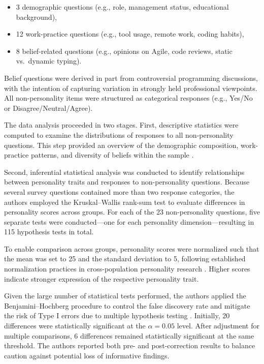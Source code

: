 \begin{itemize}
    \item 3 demographic questions (e.g., role, management status, educational background),
    \item 12 work-practice questions (e.g., tool usage, remote work, coding habits),
    \item 8 belief-related questions (e.g., opinions on Agile, code reviews, static vs.\ dynamic typing).
\end{itemize}

Belief questions were derived in part from controversial programming discussions, with the intention of capturing variation in strongly held professional viewpoints. All non-personality items were structured as categorical responses (e.g., Yes/No or Disagree/Neutral/Agree).

The data analysis proceeded in two stages. First, descriptive statistics were computed to examine the distributions of responses to all non-personality questions. This step provided an overview of the demographic composition, work-practice patterns, and diversity of beliefs within the sample .

Second, inferential statistical analysis was conducted to identify relationships between personality traits and responses to non-personality questions. Because several survey questions contained more than two response categories, the authors employed the Kruskal–Wallis rank-sum test to evaluate differences in personality scores across groups. For each of the 23 non-personality questions, five separate tests were conducted—one for each personality dimension—resulting in 115 hypothesis tests in total.

To enable comparison across groups, personality scores were normalized such that the mean was set to 25 and the standard deviation to 5, following established normalization practices in cross-population personality research \cite{Schmitt2007}. Higher scores indicate stronger expression of the respective personality trait.

Given the large number of statistical tests performed, the authors applied the Benjamini–Hochberg procedure to control the false discovery rate and mitigate the risk of Type I errors due to multiple hypothesis testing \cite{Benjamini1995}. Initially, 20 differences were statistically significant at the $\alpha = 0.05$ level. After adjustment for multiple comparisons, 6 differences remained statistically significant at the same threshold. The authors reported both pre- and post-correction results to balance caution against potential loss of informative findings.

